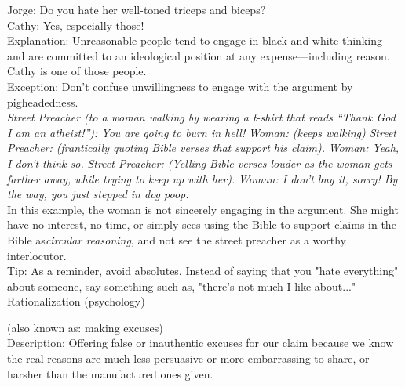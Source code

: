 \documentclass[a4paper,12pt,single,pdftex]{scrartcl}
\begin{document}
    
      Jorge: Do you hate her well-toned triceps and biceps?
    \\

    
      Cathy: Yes, especially those!
    \\

    
      Explanation: Unreasonable people tend to engage in black-and-white thinking and are committed to an ideological position at any expense—including reason. Cathy is one of those people.
    \\

    
      Exception: Don’t confuse unwillingness to engage with the argument by pigheadedness.
    \\

    
      {\em Street Preacher (to a woman walking by wearing a t-shirt that reads “Thank God I am an atheist!”): You are going to burn in hell!} \newline
{\em Woman: (keeps walking)} \newline
{\em Street Preacher: (frantically quoting Bible verses that support his claim).} \newline
{\em Woman: Yeah, I don’t think so.} \newline
{\em Street Preacher: (Yelling Bible verses louder as the woman gets farther away, while trying to keep up with her).} \newline
{\em Woman: I don’t buy it, sorry! By the way, you just stepped in dog poop.}
    \\

    
      In this example, the woman is not sincerely engaging in the argument. She might have no interest, no time, or simply sees using the Bible to support claims in the Bible as{\em  {\it circular reasoning}}, and not see the street preacher as a worthy interlocutor.
    \\

    
      Tip: As a reminder, avoid absolutes. Instead of saying that you "hate everything" about someone, say something such as, "there's not much I like about..."
    \\

  

Rationalization (psychology)
    
      (also known as: making excuses)
    \\

  
    Description: Offering false or inauthentic excuses for our claim because we know the real reasons are much less persuasive or more embarrassing to share, or harsher than the manufactured ones given.
\end{document}
